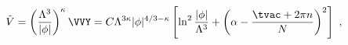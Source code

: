 \begin{equation}
\label{V2}
  \tilde{V} = \left(\frac{\Lambda^3}{|\phi|}\right)^\kappa \VVY = C
  \Lambda^{3\kappa} |\phi|^{4/3-\kappa} \left[ \ln^2 \frac{|\phi|}{\Lambda^3} 
  + \left( \alpha -\frac{\tvac+2\pi n}{N} \right)^2 \right]~,
\end{equation}

